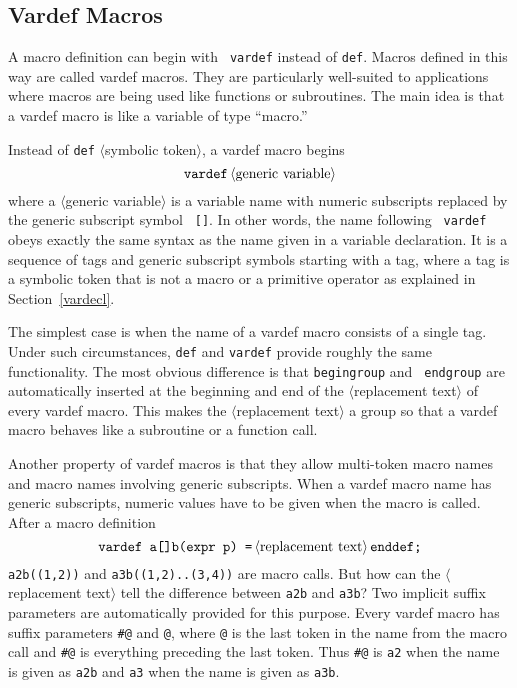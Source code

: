 \documentclass{article} %
\newcommand\descr[1]{{\langle\hbox{#1}\rangle}}
\newcommand\invisgap{\nobreak\hskip0pt\relax}
\newcommand\tdescr[1]{$\langle$\invisgap#1\invisgap$\rangle$}
\begin{document}
\subsection{Vardef Macros}

A macro definition can begin with {\tt
vardef} instead of {\tt def}.  Macros
defined in this way are called vardef macros.  They are particularly
well-suited to applications where macros are being used like functions
or subroutines.  The main idea is that a vardef macro is like a variable
of type ``macro.''

Instead of {\tt def} \tdescr{symbolic token}, a vardef macro begins
$$ {\tt vardef}\, \descr{generic variable} $$
where a \tdescr{generic variable}\index{generic variable?\tdescr{generic
variable}} is a variable name with numeric subscripts replaced by the
generic subscript symbol {\tt
[]}.  In other words, the name following {\tt
vardef} obeys exactly the same syntax as the name given in a variable
declaration.  It is a sequence of tags and generic subscript symbols
starting with a tag, where a tag is a symbolic token that is
not a macro or a primitive operator as explained in
Section~\ref{vardecl}.

The simplest case is when the name of a vardef macro consists of a
single tag.  Under such circumstances, {\tt def} and {\tt vardef}
provide roughly the same functionality.  The most obvious difference is
that {\tt begingroup} and {\tt
endgroup} are automatically inserted
at the beginning and end of the \tdescr{replacement text} of every
vardef macro.  This makes the \tdescr{replacement text} a group so that
a vardef macro behaves like a subroutine or a function call.

Another property of vardef macros is that they allow multi-token macro
names and macro names involving generic subscripts.  When a vardef macro
name has generic subscripts, numeric values have to be given when the
macro is called.  After a macro definition
$$ \hbox{\tt vardef a[]b(expr p) =}\, \descr{replacement text}\,
   \hbox{\tt enddef;}
$$
{\tt a2b((1,2))} and {\tt a3b((1,2)..(3,4))} are macro calls.  But how
can the \tdescr{replacement text} tell the difference between {\tt a2b}
and {\tt a3b}?  Two implicit suffix parameters
are automatically provided for this purpose.  Every vardef macro has
suffix parameters \verb|#@| and
\verb|@|, where \verb|@| is the last token in the
name from the macro call and \verb|#@| is everything preceding the last
token.  Thus \verb|#@| is {\tt a2} when the name is given as {\tt a2b}
and {\tt a3} when the name is given as {\tt a3b}.
\end{document}
